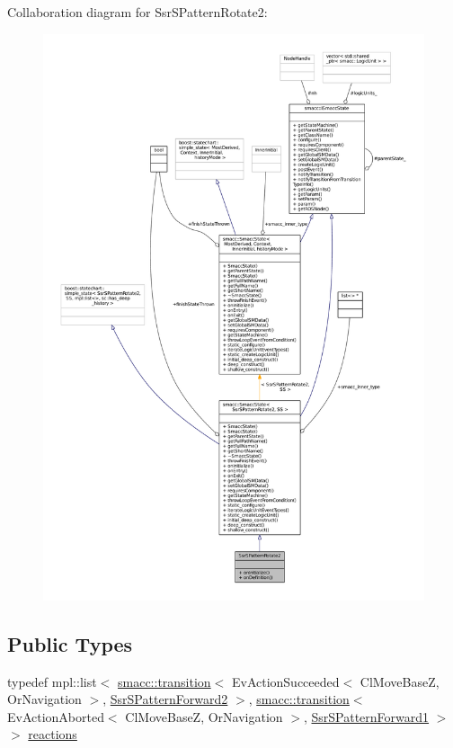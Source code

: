 Collaboration diagram for Ssr\+S\+Pattern\+Rotate2\+:
\nopagebreak
\begin{figure}[H]
\begin{center}
\leavevmode
\includegraphics[width=350pt]{structSsrSPatternRotate2__coll__graph}
\end{center}
\end{figure}
\subsection*{Public Types}
\begin{DoxyCompactItemize}
\item 
typedef mpl\+::list$<$ \hyperlink{classsmacc_1_1transition}{smacc\+::transition}$<$ Ev\+Action\+Succeeded$<$ Cl\+Move\+BaseZ, Or\+Navigation $>$, \hyperlink{structSsrSPatternForward2}{Ssr\+S\+Pattern\+Forward2} $>$, \hyperlink{classsmacc_1_1transition}{smacc\+::transition}$<$ Ev\+Action\+Aborted$<$ Cl\+Move\+BaseZ, Or\+Navigation $>$, \hyperlink{structSsrSPatternForward1}{Ssr\+S\+Pattern\+Forward1} $>$ $>$ \hyperlink{structSsrSPatternRotate2_a35ff2627d5a401f8b46e0ef601d34443}{reactions}
\end{DoxyCompactItemize}
